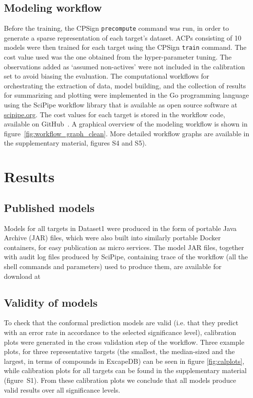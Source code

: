 \documentclass[10pt,article]{memoir}
\begin{document}
\subsection*{Modeling workflow}
Before the training, the CPSign \texttt{precompute} command was run, in order
to generate a sparse representation of each target's dataset.  ACPs consisting
of 10 models were then trained for each target using the CPSign \texttt{train}
command. The cost value used was the one obtained from the hyper-parameter
tuning. The observations added as `assumed non-actives' were not included in
the calibration set to avoid biasing the evaluation.
The computational workflows for orchestrating the extraction of data, model
building, and the collection of results for summarizing and plotting were
implemented in the Go programming language using the SciPipe workflow library
that is available as open source software at
\href{http://scipipe.org}{scipipe.org}.  The cost values for each target is
stored in the workflow code, available on GitHub~\cite{PTPGitHub}.
A graphical overview of the modeling workflow is shown in
figure~\ref{fig:workflow_graph_clean}. More detailed workflow graphs are
available in the supplementary material, figures S4 and S5).


\section*{Results}

\subsection*{Published models}
Models for all targets in Dataset1 were produced in the form of portable Java
Archive (JAR) files, which were also built into similarly portable Docker
containers, for easy publication as micro services.  The model JAR files,
together with audit log files produced by SciPipe, containing trace of the
workflow (all the shell commands and parameters) used to produce them, are
available for download at~\cite{ModelsZenodo}

\subsection*{Validity of models}
To check that the conformal prediction models are valid (i.e. that they predict with
an error rate in accordance to the selected significance level), calibration plots
were generated in the cross validation step of the workflow. Three example
plots, for three representative targets (the smallest, the median-sized and the
largest, in terms of compounds in ExcapeDB) can be seen in figure
\ref{fig:calplots}, while calibration plots for all targets can be
found in the supplementary material (figure~S1).
From these calibration plots we conclude that all models produce valid results over all
significance levels.
\end{document}
